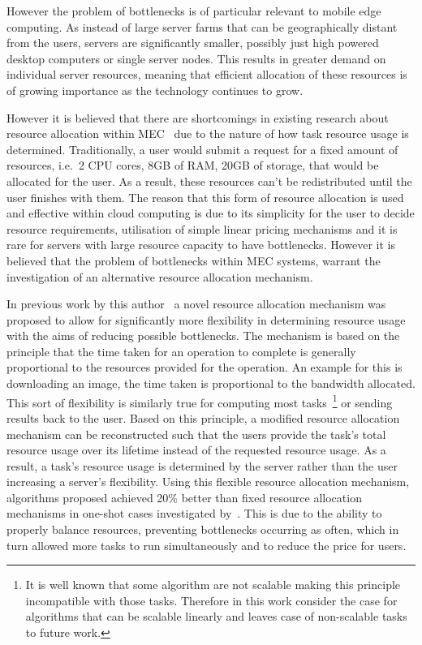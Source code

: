 However the problem of bottlenecks is of particular relevant to mobile edge computing. As instead of large server
farms that can be geographically distant from the users, servers are significantly smaller, possibly
just high powered desktop computers or single server nodes. This results in greater demand on individual server
resources, meaning that efficient allocation of these resources is of growing importance as the technology continues to
grow.

However it is believed that there are shortcomings in existing research about resource allocation within
MEC~\citep{vaji_infocom, Bi2019} due to the nature of how task resource usage is determined. Traditionally,
a user would submit a request for a fixed amount of resources, i.e.\ 2 CPU cores, 8GB of RAM, 20GB of storage, that
would be allocated for the user. As a result, these resources can't be redistributed until the user finishes with them.
The reason that this form of resource allocation is used and effective within cloud computing is due to its simplicity
for the user to decide resource requirements, utilisation of simple linear pricing mechanisms and it is rare for servers
with large resource capacity to have bottlenecks. However it is believed that the problem of bottlenecks within MEC systems,
warrant the investigation of an alternative resource allocation mechanism.

In previous work by this author~\citep{FlexibleResourceAllocation} a novel resource allocation mechanism was
proposed to allow for significantly more flexibility in determining resource usage with the aims of reducing possible
bottlenecks. The mechanism is based on the principle that the time taken for an operation to complete is generally
proportional to the resources provided for the operation. An example for this is downloading an image, the time taken
is proportional to the bandwidth allocated. This sort of flexibility is similarly true for computing most
tasks~\footnote{It is well known that some algorithm are not scalable making this principle incompatible with those
tasks. Therefore in this work consider the case for algorithms that can be scalable linearly and leaves case of
non-scalable tasks to future work.}
or sending results back to the user. Based on this principle, a modified resource allocation mechanism can be
reconstructed such that the users provide the task's total resource usage over its lifetime instead of the requested
resource usage. As a result, a task's resource usage is determined by the server rather than the user increasing a
server's flexibility. Using this flexible resource allocation mechanism, algorithms proposed achieved 20\%
better than fixed resource allocation mechanisms in one-shot cases investigated by~\cite{FlexibleResourceAllocation}.
This is due to the ability to properly balance resources, preventing bottlenecks occurring as often, which in turn allowed
more tasks to run simultaneously and to reduce the price for users.

